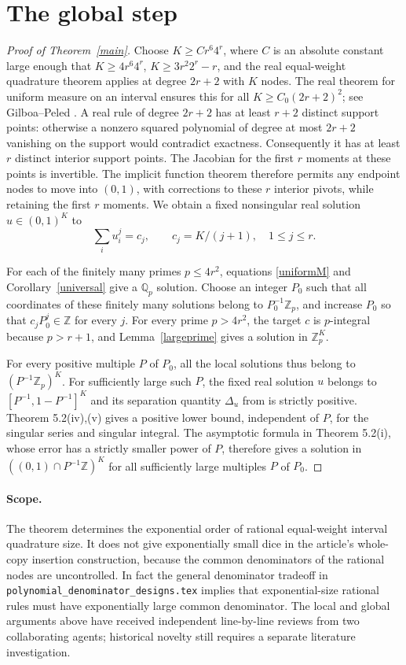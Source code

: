 \documentclass[11pt]{article}
\newcommand{\Q}{\mathbb Q}
\newcommand{\Z}{\mathbb Z}
\begin{document}
\section{The global step}
\begin{proof}[Proof of Theorem~\ref{main}]
Choose $K\ge C r^6 4^r$, where $C$ is an absolute constant large enough
that $K\ge4r^6 4^r$, $K\ge3r^2 2^r-r$, and the real equal-weight
quadrature theorem applies at degree $2r+2$ with $K$ nodes.
The real theorem for uniform measure on an interval ensures this for
all $K\ge C_0(2r+2)^2$; see Gilboa--Peled \cite{gp}.
A real rule of degree $2r+2$ has at least $r+2$ distinct support points:
otherwise a nonzero squared polynomial of degree at most $2r+2$ vanishing
on the support would contradict exactness. Consequently it has at least
$r$ distinct interior support points. The Jacobian for the first $r$
moments at these points is invertible. The implicit function theorem
therefore permits any endpoint nodes to move into $(0,1)$, with corrections
to these $r$ interior pivots, while retaining the first $r$ moments.
We obtain a fixed nonsingular real solution $u\in(0,1)^K$ to
\[
 \sum_i u_i^j=c_j,\qquad c_j=K/(j+1),\quad1\le j\le r.
\]

For each of the finitely many primes $p\le4r^2$, equations
\eqref{uniformM} and Corollary~\ref{universal} give a $\Q_p$ solution.
Choose an integer $P_0$ such that all coordinates of these finitely many
solutions belong to $P_0^{-1}\Z_p$, and increase $P_0$ so that
$c_jP_0^j\in\Z$ for every $j$. For every prime $p>4r^2$, the target
$c$ is $p$-integral because $p>r+1$, and Lemma~\ref{largeprime} gives a
solution in $\Z_p^K$.

For every positive multiple $P$ of $P_0$, all the local solutions thus
belong to $(P^{-1}\Z_p)^K$. For sufficiently large such $P$, the fixed
real solution $u$ belongs to $[P^{-1},1-P^{-1}]^K$ and its separation
quantity $\Delta_u$ from \cite[Theorem 5.2(v)]{cxx} is strictly positive.
Theorem 5.2(iv),(v) gives a positive lower bound, independent of $P$,
for the singular series and singular integral. The asymptotic formula
in Theorem 5.2(i), whose error has a strictly smaller power of $P$,
therefore gives a solution in $((0,1)\cap P^{-1}\Z)^K$ for all sufficiently
large multiples $P$ of $P_0$.
\end{proof}

\paragraph{Scope.}
The theorem determines the exponential order of rational equal-weight
interval quadrature size. It does not give exponentially small dice
in the article's whole-copy insertion construction, because the common
denominators of the rational nodes are uncontrolled. In fact the
general denominator tradeoff in \texttt{polynomial\_denominator\_designs.tex}
implies that exponential-size rational rules must have exponentially large
common denominator. The local and global arguments above have received
independent line-by-line reviews from two collaborating agents; historical
novelty still requires a separate literature investigation.
\end{document}
